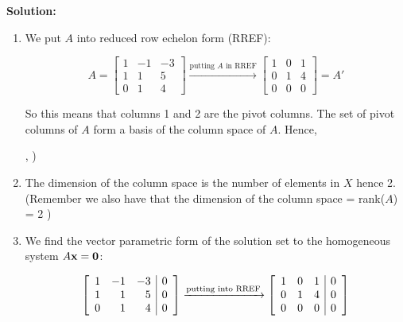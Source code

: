 \documentclass[12pt]{article}
\newcommand*\mybluebox[1]{%
\colorbox{myblue}{\hspace{1em}#1\hspace{1em}}}
\begin{document}
{\bf Solution:} 

\begin{enumerate}
\item We put $A$ into reduced row echelon form (RREF):

\[ A=\left[ \begin{array}{rrr} 1 & -1 & -3  \\ 1 & 1 & 5 \\ 0&1&4  \end{array} \right] \xrightarrow[]{\text{putting } A \text{ in RREF}}  \left[ \begin{array}{rrr} 1 & 0 & 1  \\ 0 & 1 & 4 \\ 0&0&0  \end{array} \right]=A'
\]

So this means that columns 1 and 2 are the pivot columns.  The set of pivot columns of $A$ form a basis of the column space of $A$.  Hence,

\begin{empheq}[box=\mybluebox]{align*}
X =  \left( \left[ \begin{array}{r} 1 \\ 1  \\ 0  \end{array} \right], \left[ \begin{array}{r} -1 \\  1 \\ 1  \end{array} \right] \right)
\end{empheq}

\item The dimension of the column space is the number of elements in $X$ hence \colorbox{myblue}{2}.  (Remember we also have that the dimension of the column space = rank($A$) = 2  )
 
\item We find the vector parametric form of the solution set to the homogeneous system $A{\bf x}={\bf 0}$:

\[ \left[ \begin{array}{rrr| r} 1 & -1 & -3 & 0 \\ 1 & 1 & 5 & 0 \\ 0&1&4 &0 \end{array} \right] \xrightarrow[]{\text{putting into RREF}}  \left[ \begin{array}{rrr| r} 1 & 0 & 1 &0 \\ 0 & 1 & 4& 0 \\ 0&0&0& 0  \end{array} \right]
\]


\end{enumerate}
\end{document}

